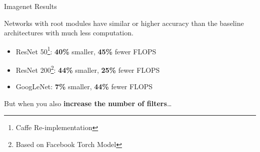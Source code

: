 \documentclass[t,xcolor=dvipsnames]{beamer}
\begin{document}
\begin{frame}{Imagenet Results}

Networks with root modules have similar or higher accuracy than the baseline architectures with much less computation.
\begin{itemize}
    \item ResNet 50\footnote{Caffe Re-implementation}: \textbf{40\%} smaller, \textbf{45\%} fewer FLOPS%
    \item ResNet 200\footnote{Based on Facebook Torch Model}: \textbf{44\%} smaller, \textbf{25\%} fewer FLOPS
    \item GoogLeNet: \textbf{7\%} smaller, \textbf{44\%} fewer FLOPS%
\end{itemize}
\vfill
But when you also \textbf{increase the number of filters}\ldots
\end{frame}

\end{document}
